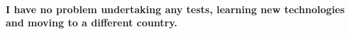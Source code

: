 \documentclass[11pt, a4paper]{awesome-cv} %
\begin{document}
\makecvheader %
\vspace{-0.5cm}
\paragraph{I have no problem undertaking any tests, learning new technologies and moving to a different country.\\}
\bigskip
\noindent




\end{document}

